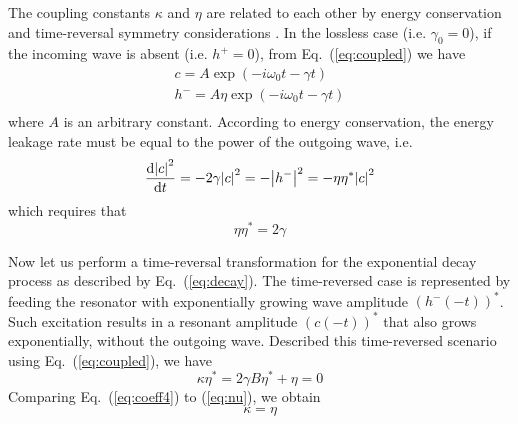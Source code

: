 \documentclass[preprint,aps]{revtex4}
\begin{document}

The coupling constants $\kappa$ and $\eta$ are related to each other
by energy conservation and time-reversal symmetry considerations
\cite{fan2003temporal}. In the lossless case (i.e. $\gamma_0=0$), if
the incoming wave is absent (i.e. $h^+=0$),  from
Eq.~(\ref{eq:coupled}) we have
\begin{equation}
\label{eq:decay}
\begin{array}{l}
 c = A\exp ( - i{\omega _0}t - \gamma t) \\
 {h}^ -  = A\eta \exp ( - i{\omega _0}t - \gamma t) \\
 \end{array}\end{equation}
where $A$ is an arbitrary constant. According to energy
conservation, the energy leakage rate must be equal to the power of
the outgoing wave, i.e.
\begin{equation}
\frac{{{\rm{d}}{{\left| c \right|}^2}}}{{{\rm{d}}t}} =  - 2\gamma
{{\left| c \right|}^2} =  - {\left| {h^ - } \right|^2} =  - \eta
{\eta ^*}{{\left| c \right|}^2}
\end{equation}
which requires that
\begin{equation}
\label{eq:nu}
 \eta {\eta ^*} = 2\gamma
\end{equation}


Now let us perform a time-reversal transformation for the
exponential decay process as described by Eq.~(\ref{eq:decay}). The
time-reversed case is represented by feeding the resonator with
exponentially growing wave amplitude $(h^-(-t))^*$. Such excitation
results in a resonant amplitude  $(c(-t))^*$ that also grows
exponentially, without the outgoing wave. Described this
time-reversed scenario using Eq.~(\ref{eq:coupled}), we have
\begin{subequations}
\begin{equation}
\label{eq:coeff4}
 \kappa {\eta ^*} = 2\gamma
\end{equation}
\begin{equation}
 B{\eta ^*} + \eta  = 0
\end{equation}
\end{subequations} Comparing Eq.~(\ref{eq:coeff4}) to (\ref{eq:nu}), we obtain
\begin{equation}
\label{eq:coeff5}
 \kappa = \eta
\end{equation}
\end{document}
